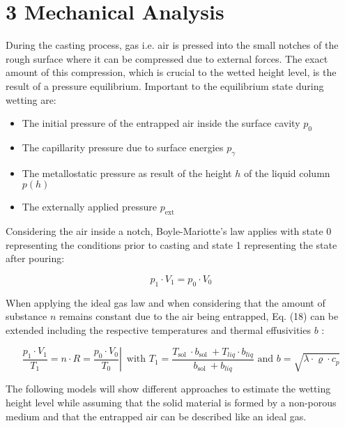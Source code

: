 \documentclass[10pt]{article}
\begin{document}
\section*{3 Mechanical Analysis}
During the casting process, gas i.e. air is pressed into the small notches of the rough surface where it can be compressed due to external forces. The exact amount of this compression, which is crucial to the wetted height level, is the result of a pressure equilibrium. Important to the equilibrium state during wetting are:

\begin{itemize}
  \item The initial pressure of the entrapped air inside the surface cavity $p_{0}$

  \item The capillarity pressure due to surface energies $p_{\gamma}$

  \item The metallostatic pressure as result of the height $h$ of the liquid column $p(h)$

  \item The externally applied pressure $p_{\text {ext }}$

\end{itemize}

Considering the air inside a notch, Boyle-Mariotte's law applies with state 0 representing the conditions prior to casting and state 1 representing the state after pouring:


\begin{equation*}
p_{1} \cdot V_{1}=p_{0} \cdot V_{0} \tag{18}
\end{equation*}


When applying the ideal gas law and when considering that the amount of substance $n$ remains constant due to the air being entrapped, Eq. (18) can be extended including the respective temperatures and thermal effusivities $b$ :


\begin{equation*}
\left.\frac{p_{1} \cdot V_{1}}{T_{1}}=n \cdot R=\frac{p_{0} \cdot V_{0}}{T_{0}} \right\rvert\, \text { with } T_{1}=\frac{T_{\text {sol }} \cdot b_{\text {sol }}+T_{l i q} \cdot b_{l i q}}{b_{\text {sol }}+b_{l i q}} \text { and } b=\sqrt{\lambda \cdot \varrho \cdot c_{p}} \tag{19}
\end{equation*}


The following models will show different approaches to estimate the wetting height level while assuming that the solid material is formed by a non-porous medium and that the entrapped air can be described like an ideal gas.
\end{document}
